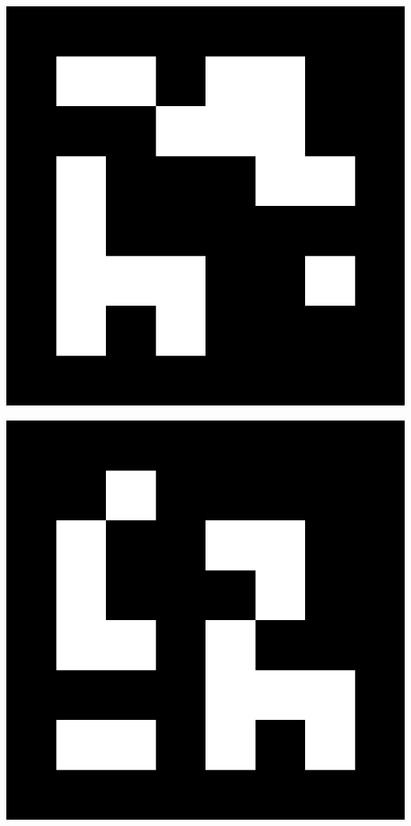 \newpage
\myemptypage
\vspace{5cm}
\begin{center}
\includegraphics[width=\textwidth, keepaspectratio]{aruco_05.png}
\end{center}
\newpage
\myemptypage
\vspace{5cm}
\begin{center}
\includegraphics[width=\textwidth, keepaspectratio]{aruco_06.png}
\end{center}
